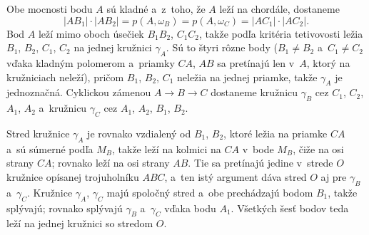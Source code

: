 {    Obe mocnosti bodu $A$ sú kladné a~z~toho, že $A$ leží na chordále, dostaneme
    $$
    |AB_1| \cdot |AB_2| = p(A,\omega_B) = p(A,\omega_C) = |AC_1| \cdot |AC_2|.
    $$
    Bod $A$ leží mimo oboch úsečiek $B_1B_2$, $C_1C_2$, takže podľa kritéria tetivovosti ležia $B_1$, $B_2$, $C_1$, $C_2$ na jednej kružnici $\gamma_A$. Sú to štyri rôzne body ($B_1 \neq B_2$ a~$C_1 \neq C_2$ vďaka kladným polomerom a~priamky $CA$, $AB$ sa pretínajú len v~$A$, ktorý na kružniciach neleží), pričom $B_1$, $B_2$, $C_1$ neležia na jednej priamke, takže $\gamma_A$ je jednoznačná. Cyklickou zámenou $A \to B \to C$ dostaneme kružnicu $\gamma_B$ cez $C_1$, $C_2$, $A_1$, $A_2$ a~kružnicu $\gamma_C$ cez $A_1$, $A_2$, $B_1$, $B_2$.

    Stred kružnice $\gamma_A$ je rovnako vzdialený od $B_1$, $B_2$, ktoré ležia na priamke $CA$ a~sú súmerné podľa $M_B$, takže leží na kolmici na $CA$ v~bode $M_B$, čiže na osi strany $CA$; rovnako leží na osi strany $AB$. Tie sa pretínajú jedine v~strede $O$ kružnice opísanej trojuholníku $ABC$, a~ten istý argument dáva stred $O$ aj pre $\gamma_B$ a~$\gamma_C$. Kružnice $\gamma_A$, $\gamma_C$ majú spoločný stred a~obe prechádzajú bodom $B_1$, takže splývajú; rovnako splývajú $\gamma_B$ a~$\gamma_C$ vďaka bodu $A_1$. Všetkých šesť bodov teda leží na jednej kružnici so stredom $O$.
}

